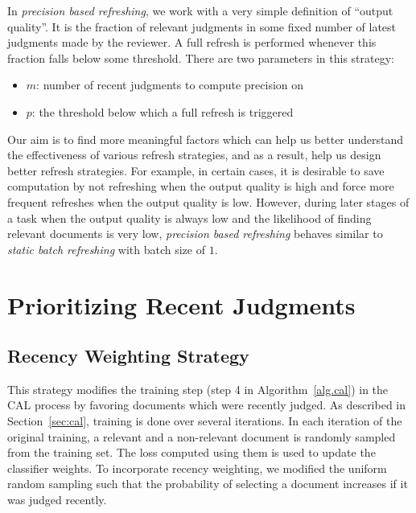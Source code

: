 In \textit{precision based refreshing}, we work with a very simple definition of
``output quality''. It is the fraction of relevant judgments in some fixed
number of latest judgments made by the reviewer. A full refresh is performed
whenever this fraction falls below some threshold. There are two parameters in
this strategy:
\begin{itemize}
    \item $m$: number of recent judgments to compute precision on
    \item $p$: the threshold below which a full refresh is triggered
\end{itemize}

Our aim is to find more meaningful factors which can help us better understand
the effectiveness of various refresh strategies, and as a result, help us design
better refresh strategies. For example, in certain cases, it is desirable to
save computation by not refreshing when the output quality is high and force
more frequent refreshes when the output quality is low. However, during later
stages of a task when the output quality is always low and the likelihood of
finding relevant documents is very low, \textit{precision based refreshing}
behaves similar to \textit{static batch refreshing} with batch size of $1$.


\section{Prioritizing Recent Judgments}

\subsection{Recency Weighting Strategy}
This strategy modifies the training step (step 4 in Algorithm~\ref{alg.cal}) in
the CAL process by favoring documents which were recently judged. As described
in Section~\ref{sec:cal}, training is done over several iterations. In each
iteration of the original training, a relevant and a non-relevant document is
randomly sampled from the training set. The loss computed using them is used to
update the classifier weights. To incorporate recency weighting, we modified the
uniform random sampling such that the probability of selecting a document
increases if it was judged recently.

